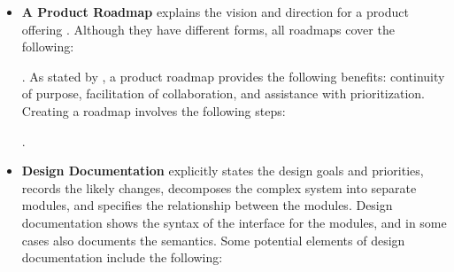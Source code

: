 \documentclass[11pt]{article}
\begin{document}
\begin{itemize}
\item \textbf{A Product Roadmap} explains the vision and direction for a product
offering \citep{MunchEtAl2019}.  Although they have different forms, all
roadmaps cover the following:  \citep{PhaalEtAl2005}. As
stated by \citet{Pichler2012}, a product roadmap provides the following
benefits: continuity of purpose, facilitation of collaboration, and assistance
with prioritization. Creating a roadmap involves the following steps:
 \citep{VahaniittyEtAl2002}.  

\item \textbf{Design Documentation} explicitly states the design goals and
priorities, records the likely changes, decomposes the complex system into
separate modules, and specifies the relationship between the modules. Design
documentation shows the syntax of the interface for the modules, and in some
cases also documents the semantics.  Some potential elements of design
documentation include the following:


\end{itemize}
\end{document}
